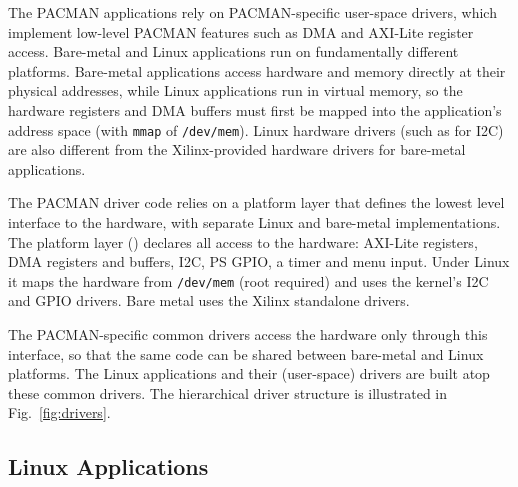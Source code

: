 \documentclass[12pt]{article}
\begin{document}
\noindent
The PACMAN applications rely on PACMAN-specific user-space drivers, which implement low-level PACMAN
features such as DMA and AXI-Lite register access.  Bare-metal and Linux applications run on
fundamentally different platforms. Bare-metal applications access hardware and memory directly at
their physical addresses, while Linux applications run in virtual memory, so the hardware registers
and DMA buffers must first be mapped into the application's address space (with \texttt{mmap} of
\texttt{/dev/mem}).  Linux hardware drivers (such as for I2C) are also different from the
Xilinx-provided hardware drivers for bare-metal applications.

The PACMAN driver code relies on a platform layer that defines the lowest level interface to the
hardware, with separate Linux and bare-metal implementations.  The platform layer
() declares all access to the hardware: AXI-Lite
registers, DMA registers and buffers, I2C, PS GPIO, a timer and menu input.  Under Linux it maps the
hardware from \texttt{/dev/mem} (root required) and uses the kernel's I2C and GPIO drivers.  Bare
metal uses the Xilinx standalone drivers.

The PACMAN-specific common drivers access the hardware only through this interface, so that the same
code can be shared between bare-metal and Linux platforms.  The Linux applications and their
(user-space) drivers are built atop these common drivers.  The hierarchical driver structure is
illustrated in Fig.~\ref{fig:drivers}.

\subsection{Linux Applications}\label{sec:apps}
\end{document}
